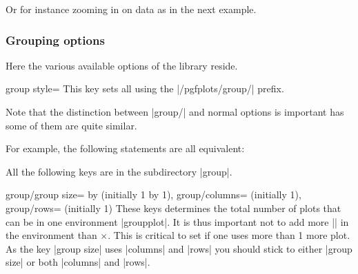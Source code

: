 {\begin{command}{\nextgroupplot{} }
Or for instance zooming in on data as in the next example.
\begin{codeexample}[]
\end{codeexample}
\end{command}


\subsubsection{Grouping options}
\label{sec:pgfplots:group:options}

Here the various available options of the library reside. 

\begin{pgfplotskey}{group style=}
  This key sets all  using the |/pgfplots/group/| prefix.
  
  Note that the distinction between |group/| and normal options is important has some of them are quite similar.

   For example, the following statements are all equivalent:
\begin{codeexample}
\pgfplotsset{group/a=2,group/b=3}
\pgfplotsset{group/.cd,a=2,b=3}
\end{codeexample}
\end{pgfplotskey}
All the following keys are in the subdirectory |group|.

\begin{pgfplotskeylist}{group/group size= by  (initially 1 by 1),
      group/columns= (initially 1),
      group/rows= (initially 1)}
  These keys determines the total number of plots that can be in one environment |groupplot|. It is thus important not to add more
  |\nextgroupplot| in the environment than $\times$. This is critical to set if one uses more than 1 more plot. As
  the key |group size| uses |columns| and |rows| you should stick to either |group size| or both |columns| and |rows|.
\end{pgfplotskeylist}

}
